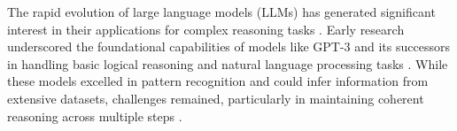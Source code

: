 \documentclass[conference]{IEEEtran}
\begin{document}

%
%
%
The rapid evolution of large language models (LLMs) has generated significant interest in their applications for complex reasoning tasks \cite{chen2024large, hadi2024large}. Early research underscored the foundational capabilities of models like GPT-3 and its successors in handling basic logical reasoning and natural language processing tasks \cite{zhang2021commentary, kalyan2023survey}. While these models excelled in pattern recognition and could infer information from extensive datasets, challenges remained, particularly in maintaining coherent reasoning across multiple steps \cite{yang2024harnessing}.
\end{document}
